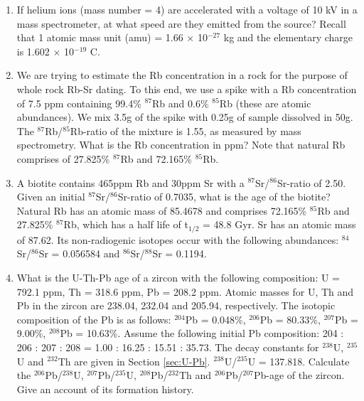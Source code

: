\documentclass{book}
\begin{document}
\begin{enumerate}

\item If helium ions (mass number = 4) are accelerated with a voltage
  of 10 kV in a mass spectrometer, at what speed are they emitted from
  the source? Recall that 1 atomic mass unit (amu) = 1.66 $\times$
  10$^{-27}$ kg and the elementary charge is 1.602 $\times$ 10$^{-19}$
  C. 

\item We are trying to estimate the Rb concentration in a rock for the
  purpose of whole rock Rb-Sr dating. To this end, we use a spike with
  a Rb concentration of 7.5 ppm containing 99.4\% $^{87}$Rb and 0.6\%
  $^{85}$Rb (these are atomic abundances). We mix 3.5g of the spike
  with 0.25g of sample dissolved in 50g. The $^{87}$Rb/$^{85}$Rb-ratio
  of the mixture is 1.55, as measured by mass spectrometry. What is
  the Rb concentration in ppm? Note that natural Rb comprises of
  27.825\% $^{87}$Rb and 72.165\% $^{85}$Rb.  

\item A biotite contains 465ppm Rb and 30ppm Sr with a
  $^{87}$Sr/$^{86}$Sr-ratio of 2.50.  Given an initial
  $^{87}$Sr/$^{86}$Sr-ratio of 0.7035, what is the age of the biotite?
  Natural Rb has an atomic mass of 85.4678 and comprises 72.165\%
  $^{85}$Rb and 27.825\% $^{87}$Rb, which has a half life of t$_{1/2}$
  = 48.8 Gyr. Sr has an atomic mass of 87.62. Its non-radiogenic
  isotopes occur with the following abundances: $^{84}$Sr/$^{86}$Sr =
  0.056584 and $^{86}$Sr/$^{88}$Sr = 0.1194.

\item What is the U-Th-Pb age of a zircon with the following
  composition: U = 792.1 ppm, Th = 318.6 ppm, Pb = 208.2 ppm. Atomic
  masses for U, Th and Pb in the zircon are 238.04, 232.04 and 205.94,
  respectively. The isotopic composition of the Pb is as follows:
  $^{204}$Pb = 0.048\%, $^{206}$Pb = 80.33\%, $^{207}$Pb = 9.00\%,
  $^{208}$Pb = 10.63\%. Assume the following initial Pb composition:
  204 : 206 : 207 : 208 = 1.00 : 16.25 : 15.51 : 35.73. The decay
  constants for $^{238}$U, $^{235}$U and $^{232}$Th are given in
  Section \ref{sec:U-Pb}. $^{238}$U/$^{235}$U = 137.818. Calculate the
  $^{206}$Pb/$^{238}$U, $^{207}$Pb/$^{235}$U, $^{208}$Pb/$^{232}$Th
  and $^{206}$Pb/$^{207}$Pb-age of the zircon. Give an account of its
  formation history. \\ 


\end{enumerate}
\end{document}
